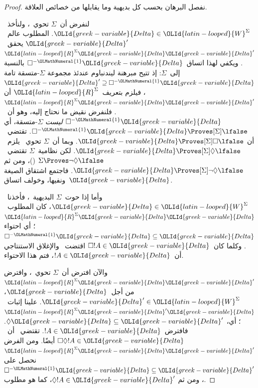 \documentclass[../../../include/open-logic-section]{subfiles}
\begin{document}
\begin{proof}
  نفصل البرهان بحسب كل بديهية وما يقابلها من خصائص العلاقة.

  لنفرض أن~$\Sigma$ تحوي~، ولنأخذ~${\OLId{greek-variable}{Delta}} \in {\OLId{latin-looped}{W}}^\Sigma$.
  المطلوب عالم~${\OLId{greek-variable}{Delta}}'$ يحقق~${\OLId{latin-looped}{R}}^\Sigma {\OLId{greek-variable}{Delta}}{\OLId{greek-variable}{Delta}}'$.
  ويكفي لهذا اتساق~$\Box^{-{\OLMathNumeral{1}}}{\OLId{greek-variable}{Delta}}$ بالنسبة إلى~$\Sigma$:
  إذ تتيح مبرهنة ليندنباوم عندئذ مجموعة $\Sigma$-متسقة تامة
  ${\OLId{greek-variable}{Delta}}' \supseteq \Box^{-{\OLMathNumeral{1}}}{\OLId{greek-variable}{Delta}}$، فيلزم بتعريف~${\OLId{latin-looped}{R}}^\Sigma$
  أن
  ${\OLId{latin-looped}{R}}^\Sigma {\OLId{greek-variable}{Delta}}{\OLId{greek-variable}{Delta}}'$.
  فلنفرض نقيض ما نحتاج إليه، وهو أن~$\Box^{-{\OLMathNumeral{1}}}{\OLId{greek-variable}{Delta}}$
  \emph{ليست} $\Sigma$-متسقة، أي $\Box^{-{\OLMathNumeral{1}}}{\OLId{greek-variable}{Delta}} \Proves[\Sigma] \lfalse$.
  تقتضي~ أن
  ${\OLId{greek-variable}{Delta}} \Proves[\Sigma] \Box\lfalse$.
  وبما أن~$\Sigma$ تحوي~ يلزم~${\OLId{greek-variable}{Delta}} \Proves[\Sigma] \Diamond\lfalse$.
  لكن نظامية~$\Sigma$ تقتضي~$\Sigma \Proves \lnot\Diamond \lfalse$
  ()، ومن ثم
  ${\OLId{greek-variable}{Delta}} \Proves[\Sigma] \lnot\Diamond \lfalse$.
  فاجتمع اشتقاق الصيغة ونفيها، وخولف اتساق~${\OLId{greek-variable}{Delta}}$.

  وأما إذا حوت~$\Sigma$ البديهية~، فأخذنا~${\OLId{greek-variable}{Delta}} \in {\OLId{latin-looped}{W}}^\Sigma$،
  كان المطلوب~${\OLId{latin-looped}{R}}^\Sigma {\OLId{greek-variable}{Delta}}{\OLId{greek-variable}{Delta}}$؛ أي احتواء
  $\Box^{-{\OLMathNumeral{1}}}{\OLId{greek-variable}{Delta}} \subseteq {\OLId{greek-variable}{Delta}}$.
  وكلما كان~$\Box!A \in {\OLId{greek-variable}{Delta}}$ اقتضت~ والإغلاق الاستنتاجي
  أن~$!A \in {\OLId{greek-variable}{Delta}}$، فتم هذا الاحتواء.

  والآن افترض أن~$\Sigma$ تحوي~، وافترض
  ${\OLId{latin-looped}{R}}^\Sigma {\OLId{greek-variable}{Delta}}{\OLId{greek-variable}{Delta}}'$ من أجل~${\OLId{greek-variable}{Delta}}$، ${\OLId{greek-variable}{Delta}}' \in {\OLId{latin-looped}{W}}^\Sigma$.
  علينا إثبات~${\OLId{latin-looped}{R}}^\Sigma {\OLId{greek-variable}{Delta}}'{\OLId{greek-variable}{Delta}}$؛ أي،
  $\Diamond{\OLId{greek-variable}{Delta}} \subseteq {\OLId{greek-variable}{Delta}}'$. فافترض~$!A \in {\OLId{greek-variable}{Delta}}$.
  تقتضي~ أن~$\Box\Diamond!A \in {\OLId{greek-variable}{Delta}}$ أيضًا. ومن الفرض
  ${\OLId{latin-looped}{R}}^\Sigma {\OLId{greek-variable}{Delta}}{\OLId{greek-variable}{Delta}}'$ نحصل على
  $\Box^{-{\OLMathNumeral{1}}}{\OLId{greek-variable}{Delta}} \subseteq {\OLId{greek-variable}{Delta}}'$، ومن ثم
  $\Diamond!A \in {\OLId{greek-variable}{Delta}}'$، كما هو مطلوب.


\end{proof}
\end{document}
